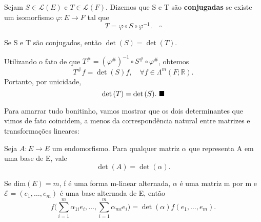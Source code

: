 \documentclass[../differential_forms.tex]{subfiles}
\begin{document}
\begin{def*}
	Sejam \(S\in \mathcal{L}(E)\) e \(T\in \mathcal{L}(F)\). Dizemos que S e T são \textbf{conjugadas} se existe um isomorfismo \(\varphi :E\rightarrow F\) tal que
	\[
		T= \varphi \circ S\circ \varphi^{-1}. \quad \square
	\]
\end{def*}
\begin{lemma*}
	Se S e T são conjugados, então \(\det{(S)} = \det{(T)}\).
\end{lemma*}
\begin{proof*}
	Utilizando o fato de que \(T^{\#}= (\varphi^{\#})^{-1}\circ S^{\#}\circ \varphi^{\#}\), obtemos
	\[
		T^{\#}f = \det{(S)}f,\quad \forall f\in \Lambda^{m}(F; \mathbb{R}).
	\]
	Portanto, por unicidade,
	\[
		\det{(T)}=\det{(S)}.\text{ $\blacksquare$}
	\]
\end{proof*}
Para amarrar tudo bonitinho, vamos mostrar que os dois determinantes que vimos de fato coincidem, a menos da correspondência natural entre matrizes e transformações lineares:
\begin{prop*}
	Seja \(A:E\rightarrow E\) um endomorfismo. Para qualquer matriz \(\alpha \) que representa A em uma base de E, vale
	\[
		\det{(A)} = \det{(\alpha )}.
	\]
\end{prop*}
\begin{crl*}
	Se \(\mathrm{dim}(E)=m\), f é uma forma m-linear alternada, \(\alpha \) é uma matriz m por m e \(\mathcal{E}=(e_1,\dotsc , e_{m})\) é uma base alternada de E, então
	\[
		f\biggl(\sum\limits_{i=1}^{m}\alpha_{1i}e_{i}, \dotsc , \sum\limits_{i=1}^{m}\alpha_{mi}e_{i}\biggr) = \det{(\alpha )}f(e_1,\dotsc , e_{m}).
	\]
\end{crl*}
\end{document}
